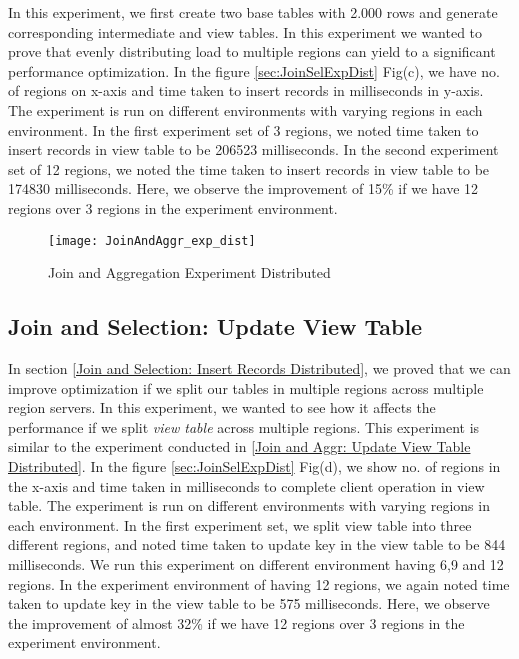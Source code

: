 \documentclass[11pt,a4paper,bibtotoc,idxtotoc,headsepline,footsepline,footexclude,BCOR12mm,DIV13]{scrbook}
\begin{document}
In this experiment, we first create two base tables with 2.000 rows and generate corresponding intermediate and view tables. In this experiment we wanted to prove that evenly distributing load to multiple regions can yield to a significant performance optimization. In the figure \ref{sec:JoinSelExpDist} Fig(c), we have no. of regions on x-axis and time taken to insert records in milliseconds in y-axis. The experiment is run on different environments with varying regions in each environment. In the first experiment set of 3 regions, we noted time taken to insert records in view table to be 206523 milliseconds. In the second experiment set of 12 regions, we noted the time taken to insert records in view table to be 174830 milliseconds. Here, we observe the improvement of 15\% if we have 12 regions over 3 regions in the experiment environment. 


\begin{figure}
	\centering
	\texttt{[image: JoinAndAggr\_exp\_dist]}
	\caption{Join and Aggregation Experiment Distributed}
	\label{sec:JoinAggrExpDist}
	
\end{figure} 

\subsection{Join and Selection: Update View Table} 
\label{Join and Sel: Update View Table Distributed}

In section \ref{Join and Selection: Insert Records Distributed},  we proved that we can improve optimization if we split our tables in multiple regions across multiple region servers. In this experiment, we wanted to see how it affects the performance if we split \emph{view table} across multiple regions. This experiment is similar to the experiment conducted in \ref{Join and Aggr: Update View Table Distributed}. In the figure \ref{sec:JoinSelExpDist} Fig(d), we show no. of regions in the x-axis and time taken in milliseconds to complete client operation in view table. The experiment is run on different environments with varying regions in each environment. In the first experiment set, we split view table into three different regions, and noted time taken to update key in the view table to be 844 milliseconds. We run this experiment on different environment having 6,9 and 12 regions. In the experiment environment of having 12 regions, we again noted time taken to update key in the view table to be 575 milliseconds. Here, we observe the improvement of almost 32\% if we have 12 regions over 3 regions in the experiment environment.
\end{document}
